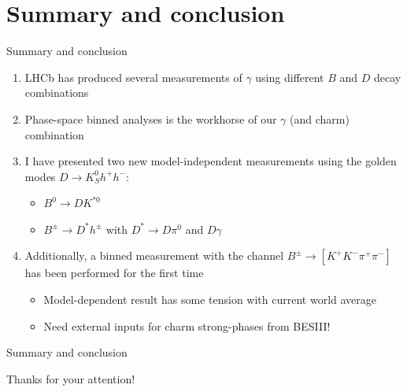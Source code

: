 \documentclass{beamer}
\begin{document}
\section{Summary and conclusion}
\begin{frame}{Summary and conclusion}
  \begin{enumerate}
    \setlength\itemsep{1.0em}
    \item{LHCb has produced several measurements of $\gamma$ using different $B$ and $D$ decay combinations}
    \item{Phase-space binned analyses is the workhorse of our $\gamma$ (and charm) combination}
    \item{I have presented two new model-independent measurements using the golden modes $D\to K_S^0h^+h^-$:}
    \begin{itemize}
      \item{$B^0\to DK^{*0}$}
      \item{$B^\pm\to D^{*}h^\pm$ with $D^*\to D\pi^0$ and $D\gamma$}
    \end{itemize}
    \item{Additionally, a binned measurement with the channel $B^\pm\to[K^+K^-\pi^+\pi^-]$ has been performed for the first time}
    \begin{itemize}
      \item{Model-dependent result has some tension with current world average}
      \item{Need external inputs for charm strong-phases from BESIII!}
    \end{itemize}
  \end{enumerate}
\end{frame}

\begin{frame}{Summary and conclusion}
  \begin{center}
    {\huge Thanks for your attention!}
  \end{center}
\end{frame}
\end{document}
